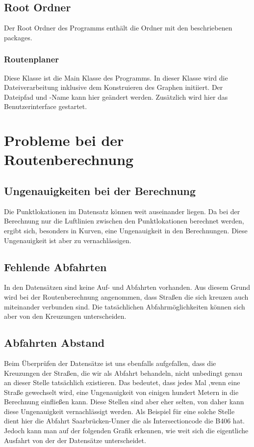 \documentclass[12pt, a4paper, ngerman]{article}
\begin{document}
\subsection{Root Ordner}
Der Root Ordner des Programms enthält die Ordner mit den beschriebenen packages.

\subsubsection{Routenplaner \label{hello}}
Diese Klasse ist die Main Klasse des Programms. In dieser Klasse wird die Dateiverarbeitung inklusive dem Konstruieren des Graphen initiiert. Der Dateipfad und -Name kann hier geändert werden. Zusätzlich wird hier das Benutzerinterface gestartet.


\section{Probleme bei der Routenberechnung \label{Probleme}}
\subsection{Ungenauigkeiten bei der Berechnung}
Die Punktlokationen im Datensatz können weit auseinander liegen. Da bei der Berechnung nur die Luftlinien zwischen den Punktlokationen berechnet werden, ergibt sich, besonders in Kurven, eine Ungenauigkeit in den Berechnungen. Diese Ungenauigkeit ist aber zu vernachlässigen.

\subsection{Fehlende Abfahrten}
In den Datensätzen sind keine Auf- und Abfahrten vorhanden. Aus diesem Grund wird bei der Routenberechnung angenommen, dass Straßen die sich kreuzen auch miteinander verbunden sind. Die tatsächlichen Abfahrmöglichkeiten können sich aber von den Kreuzungen unterscheiden.

\subsection{Abfahrten Abstand}
Beim Überprüfen der Datensätze ist uns ebenfalls aufgefallen, dass die Kreuzungen der Straßen, die wir als Abfahrt behandeln, nicht unbedingt genau an dieser Stelle tatsächlich existieren. Das bedeutet, dass jedes Mal ,wenn eine Straße gewechselt wird, eine Ungenauigkeit von einigen hundert Metern in die Berechnung einfließen kann. Diese Stellen sind aber eher selten, von daher kann diese Ungenauigkeit vernachlässigt werden. Als Beispiel für eine solche Stelle dient hier die Abfahrt Saarbrücken-Unner die als Intersectioncode die B406 hat. Jedoch kann man auf der folgenden Grafik erkennen, wie weit sich die eigentliche Ausfahrt von der der Datensätze unterscheidet.
\end{document}
